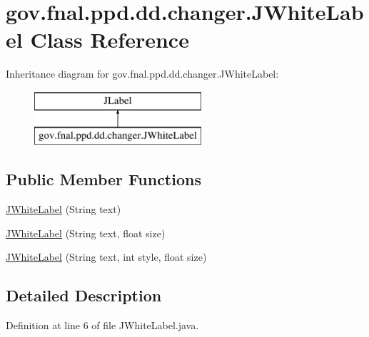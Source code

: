 \hypertarget{classgov_1_1fnal_1_1ppd_1_1dd_1_1changer_1_1JWhiteLabel}{\section{gov.\-fnal.\-ppd.\-dd.\-changer.\-J\-White\-Label Class Reference}
\label{classgov_1_1fnal_1_1ppd_1_1dd_1_1changer_1_1JWhiteLabel}
}
Inheritance diagram for gov.\-fnal.\-ppd.\-dd.\-changer.\-J\-White\-Label\-:\begin{figure}[H]
\begin{center}
\leavevmode
\includegraphics[height=2.000000cm]{classgov_1_1fnal_1_1ppd_1_1dd_1_1changer_1_1JWhiteLabel}
\end{center}
\end{figure}
\subsection*{Public Member Functions}
\begin{DoxyCompactItemize}
\item 
\hyperlink{classgov_1_1fnal_1_1ppd_1_1dd_1_1changer_1_1JWhiteLabel_a712eb7fc613d1dc37704c22de8b9b5c7}{J\-White\-Label} (String text)
\item 
\hyperlink{classgov_1_1fnal_1_1ppd_1_1dd_1_1changer_1_1JWhiteLabel_acc7bfdc750cc99a00d9b5b0ca5776793}{J\-White\-Label} (String text, float size)
\item 
\hyperlink{classgov_1_1fnal_1_1ppd_1_1dd_1_1changer_1_1JWhiteLabel_a1bfe2fecadaa8dd8350e3c443118df87}{J\-White\-Label} (String text, int style, float size)
\end{DoxyCompactItemize}


\subsection{Detailed Description}


Definition at line 6 of file J\-White\-Label.\-java.



